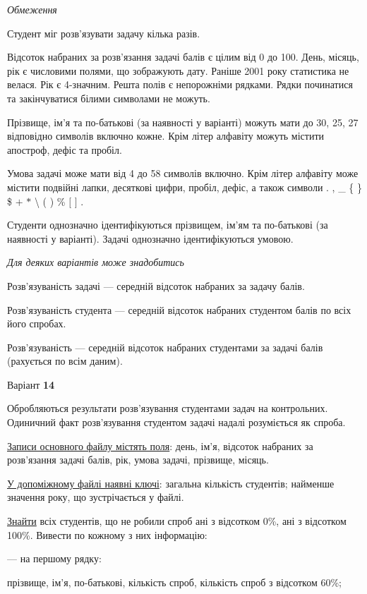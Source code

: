 \documentclass[11pt, ukrainian]{article}
\begin{document}

\bigskip\textit{Обмеження}

Студент міг розв’язувати задачу кілька разів.

Відсоток набраних за розв’язання задачі балів є цілим від 0 до 100.
День, місяць, рік є числовими полями, що зображують дату.
Раніше 2001 року статистика не велася. Рік є 4-значним.
Решта полів є непорожніми рядками.
Рядки починатися та закінчуватися білими символами не можуть.

Прізвище, ім’я та по-батькові (за наявності у варіанті) можуть мати до 30, 25, 27 відповідно символів включно кожне. 
Крім літер алфавіту можуть містити апостроф, дефіс та пробіл.

Умова задачі може мати від 4 до 58 символів включно.
Крім літер алфавіту може містити подвійні лапки, десяткові цифри, пробіл, дефіс,
а також символи . , \_ \{ \} \$ $+$ $*$ {\textbackslash} ( ) \% $[$ $]$ .

Студенти однозначно ідентифікуються прізвищем, ім’ям та по-батькові (за наявності у варіанті).
Задачі однозначно ідентифікуються умовою.

\bigskip\textit{Для деяких варіантів може знадобитись}

Розв'язуваність задачі --- середній відсоток набраних за задачу балів.

Розв'язуваність студента --- середній відсоток набраних студентом балів по всіх його спробах.

Розв'язуваність --- середній відсоток набраних студентами за задачі балів (рахується по всім даним).


\par
\newpage
{\center Варіант  \No \textbf { 14 }\par}
\bigskip
Обробляються результати розв’язування студентами задач на контрольних.
Одиничний факт роз\-в’я\-зу\-вання студентом задачі надалі розуміється як спроба.

\underline{Записи основного файлу містять поля}: день, ім’я, відсоток набраних за розв’язання задачі балів, рік, умова задачі, прізвище, місяць.

\underline{У допоміжному файлі наявні ключі}: загальна кількість студентів; найменше значення року, що зустрічається у файлі.

\underline{Знайти} всіх студентів, що не робили спроб ані з відсотком 0\%, ані з відсотком 100\%. Вивести по кожному з них інформацію:\par
{\noindent}--- на першому рядку:\par
прізвище, ім’я, по-батькові, кількість спроб, кількість спроб з відсотком 60\%;
\end{document}
